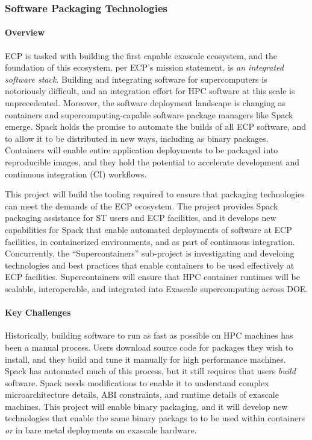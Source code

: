 \subsubsection{ Software Packaging Technologies} \label{subsubsect:sw-packaging}

\paragraph{Overview}

ECP is tasked with building the first capable exascale ecosystem, and the
foundation of this ecosystem, per ECP's mission statement, is {\it an
integrated software stack}.  Building and integrating software for
supercomputers is notoriously difficult, and an integration effort for
HPC software at this scale is unprecedented.  Moreover, the software
deployment landscape is changing as containers and supercomputing-capable
software package managers like Spack emerge.  Spack holds the promise to
automate the builds of all ECP software, and to allow it to be
distributed in new ways, including as binary packages.  Containers will
enable entire application deployments to be packaged into reproducible
images, and they hold the potential to accelerate development and
continuous integration (CI) workflows.

This project will build the tooling required to ensure that packaging
technologies can meet the demands of the ECP ecosystem.  The project
provides Spack packaging assistance for ST users and ECP facilities, and
it develops new capabilities for Spack that enable automated deployments
of software at ECP facilities, in containerized environments, and as part
of continuous integration.  Concurrently, the ``Supercontainers''
sub-project is investigating and develoing technologies and best
practices that enable containers to be used effectively at ECP
facilities. Supercontainers will ensure that HPC container runtimes will
be scalable, interoperable, and integrated into Exascale supercomputing
across DOE.


\paragraph{Key Challenges}

Historically, building software to run as fast as possible on HPC
machines has been a manual process.  Users download source code for
packages they wish to install, and they build and tune it manually for
high performance machines. Spack has automated much of this process, but
it still requires that users {\it build} software.  Spack needs
modifications to enable it to understand complex microarchitecture
details, ABI constraints, and runtime details of exascale machines.  This
project will enable binary packaging, and it will develop new
technologies that enable the same binary packags to to be used within
containers {\it or} in bare metal deployments on exascale hardware.

